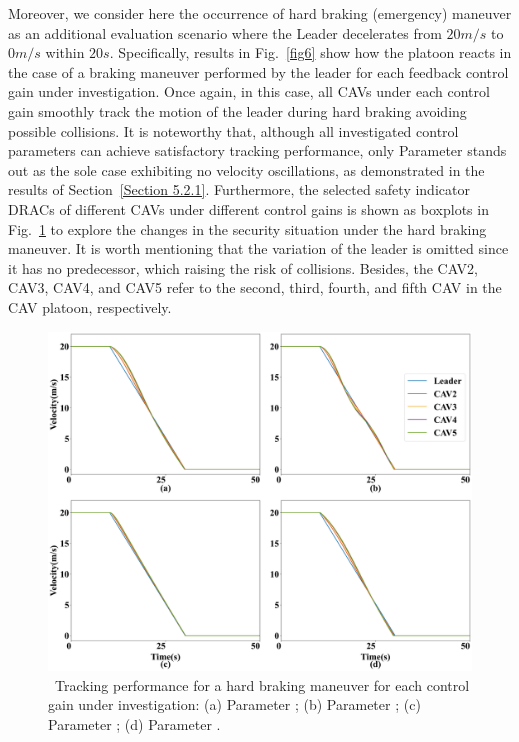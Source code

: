 \documentclass[a4paper]{cas-sc}
\begin{document}
Moreover, we consider here the occurrence of hard braking (emergency) maneuver as an additional evaluation scenario where the Leader decelerates from $20m/s$ to $0m/s$ within $20s$. Specifically, results in Fig.~\ref{fig6} show how the platoon reacts in the case of a braking maneuver performed by the leader for each feedback control gain under investigation. Once again, in this case, all CAVs under each control gain smoothly track the motion of the leader during hard braking avoiding possible collisions. It is noteworthy that, although all investigated control parameters can achieve satisfactory tracking performance, only Parameter \uppercase\expandafter{} stands out as the sole case exhibiting no velocity oscillations, as demonstrated in the results of Section~\ref{Section 5.2.1}. Furthermore, the selected safety indicator DRACs of different CAVs under different control gains is shown as boxplots in Fig.~\ref{fig7} to explore the changes in the security situation under the hard braking maneuver. It is worth mentioning that the variation of the leader is omitted since it has no predecessor, which raising the risk of collisions. Besides, the CAV2, CAV3, CAV4, and CAV5 refer to the second, third, fourth, and fifth CAV in the CAV platoon, respectively.

\begin{figure}
  \centering
  \includegraphics[width=14cm]{figs/fig7.png}
  \caption{~Tracking performance for a hard braking maneuver for each control gain under investigation: (a) Parameter \uppercase\expandafter{}; (b) Parameter \uppercase\expandafter{}; (c) Parameter \uppercase\expandafter{}; (d) Parameter \uppercase\expandafter{}.}
  \label{fig7}
\end{figure}
\end{document}
